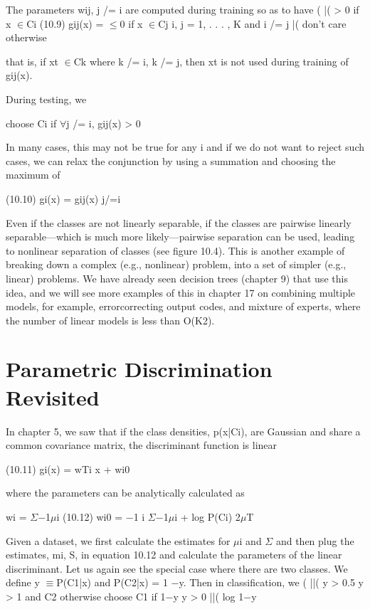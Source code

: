The parameters wij, j /= i are computed during training so as to have ( |( > 0 if x $\in$Ci (10.9) gij(x) = $\leq$0 if x $\in$Cj i, j = 1, . . . , K and i /= j |( don’t care otherwise

that is, if xt $\in$Ck where k /= i, k /= j, then xt is not used during training of gij(x).

During testing, we

choose Ci if $\forall$j /= i, gij(x) > 0

In many cases, this may not be true for any i and if we do not want to reject such cases, we can relax the conjunction by using a summation and choosing the maximum of

(10.10) gi(x) = gij(x) j/=i

Even if the classes are not linearly separable, if the classes are pairwise linearly separable---which is much more likely---pairwise separation can be used, leading to nonlinear separation of classes (see figure 10.4). This is another example of breaking down a complex (e.g., nonlinear) problem, into a set of simpler (e.g., linear) problems. We have already seen decision trees (chapter 9) that use this idea, and we will see more examples of this in chapter 17 on combining multiple models, for example, errorcorrecting output codes, and mixture of experts, where the number of linear models is less than O(K2).

\section{Parametric Discrimination Revisited}

In chapter 5, we saw that if the class densities, p(x|Ci), are Gaussian and share a common covariance matrix, the discriminant function is linear

(10.11) gi(x) = wTi x + wi0

where the parameters can be analytically calculated as

wi = $\Sigma$$-$1$\mu$i (10.12) wi0 = $-$1 i $\Sigma$$-$1$\mu$i + log P(Ci) 2$\mu$T

Given a dataset, we first calculate the estimates for $\mu$i and $\Sigma$ and then plug the estimates, mi, S, in equation 10.12 and calculate the parameters of the linear discriminant. Let us again see the special case where there are two classes. We define y $\equiv$P(C1|x) and P(C2|x) = 1 $-$y. Then in classification, we ( ||( y > 0.5 y > 1 and C2 otherwise choose C1 if 1$-$y y > 0 ||( log 1$-$y

